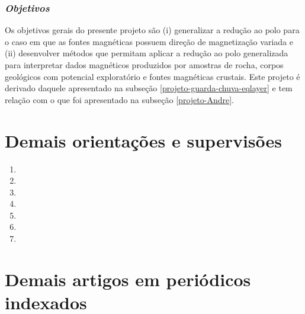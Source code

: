 \subsubsection{\emph{Objetivos}}

Os objetivos gerais do presente projeto são (i) generalizar a redução ao 
polo para o caso em que as fontes magnéticas possuem direção de magnetização variada 
e (ii) desenvolver métodos que permitam aplicar a redução ao polo generalizada para 
interpretar dados magnéticos produzidos por amostras de rocha, corpos geológicos com 
potencial exploratório e fontes magnéticas crustais.
Este projeto é derivado daquele apresentado na subseção 
\ref{projeto-guarda-chuva-eqlayer} e tem relação com o que foi apresentado na subseção 
\ref{projeto-Andre}.


\section{Demais orientações e supervisões}

\begin{enumerate}
	
	\item{}
	\item{}
	\item{}
	\item{}
	\item{}
	\item{}
	\item{}

\end{enumerate}

\section{Demais artigos em periódicos indexados}

